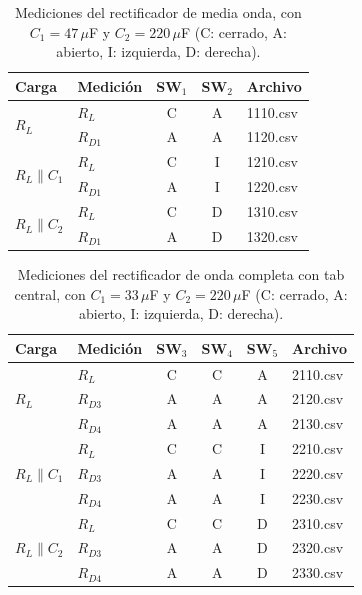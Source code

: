 \begin{table}[H]
  \centering
  \footnotesize
  \caption{Mediciones del rectificador de media onda, con $C_1 = 47\,\mu$F y $C_2 = 220\,\mu$F (C: cerrado, A: abierto, I: izquierda, D: derecha).}
  \label{tab:med_media}
  \begin{tabular}{llccl}
    \toprule
    \textbf{Carga} & \textbf{Medición} & \textbf{SW$_1$} & \textbf{SW$_2$} & \textbf{Archivo} \\ \midrule
    \multirow{2}{*}{$R_L$}               & $R_L$    & C & A & 1110.csv \\
                                         & $R_{D1}$ & A & A & 1120.csv \\ \midrule
    \multirow{2}{*}{$R_L \parallel C_1$} & $R_L$    & C & I & 1210.csv \\
                                         & $R_{D1}$ & A & I & 1220.csv \\ \midrule
    \multirow{2}{*}{$R_L \parallel C_2$} & $R_L$    & C & D & 1310.csv \\
                                         & $R_{D1}$ & A & D & 1320.csv \\ \bottomrule
  \end{tabular}
\end{table}

\begin{table}[H]
  \centering
  \footnotesize
  \caption{Mediciones del rectificador de onda completa con tab central, con $C_1 = 33\,\mu$F y $C_2 = 220\,\mu$F (C: cerrado, A: abierto, I: izquierda, D: derecha).}
  \label{tab:med_tab}
  \begin{tabular}{llcccl}
    \toprule
    \textbf{Carga} & \textbf{Medición} & \textbf{SW$_3$} & \textbf{SW$_4$} & \textbf{SW$_5$} & \textbf{Archivo} \\ \midrule
    \multirow{3}{*}{$R_L$}               & $R_L$    & C & C & A & 2110.csv \\
                                         & $R_{D3}$ & A & A & A & 2120.csv \\
                                         & $R_{D4}$ & A & A & A & 2130.csv \\ \midrule
    \multirow{3}{*}{$R_L \parallel C_1$} & $R_L$    & C & C & I & 2210.csv \\
                                         & $R_{D3}$ & A & A & I & 2220.csv \\
                                         & $R_{D4}$ & A & A & I & 2230.csv \\ \midrule
    \multirow{3}{*}{$R_L \parallel C_2$} & $R_L$    & C & C & D & 2310.csv \\
                                         & $R_{D3}$ & A & A & D & 2320.csv \\
                                         & $R_{D4}$ & A & A & D & 2330.csv \\ \bottomrule
  \end{tabular}
\end{table}


